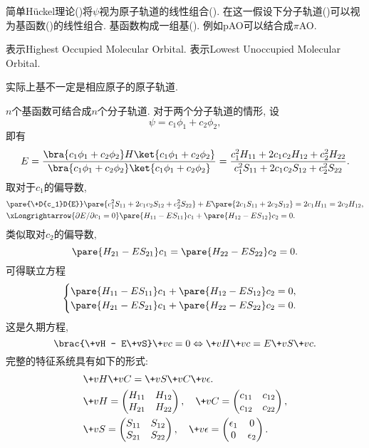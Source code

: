 \documentclass[hidelinks]{ctexart}
\begin{document}
简单H\"uckel理论()将$\psi$视为原子轨道的线性组合(). 在这一假设下分子轨道()可以视为基函数()的线性组合. 基函数构成一组基(). 例如$\mathrm{p}$AO可以结合成$\pi$AO.
\par
{}表示Highest Occupied Molecular Orbital. 表示Lowest Unoccupied Molecular Orbital.
\begin{remark}
    实际上基不一定是相应原子的原子轨道.
\end{remark}
$n$个基函数可结合成$n$个分子轨道. 对于两个分子轨道的情形, 设
\[ \psi = c_1 \phi_1 + c_2 \phi_2, \]
即有
\[ E = \frac{\bra{c_1\phi_1 + c_2 \phi_2}H\ket{c_1 \phi_1 + c_2 \phi_2}}{\bra{c_1\phi_1 + c_2 \phi_2}\ket{c_1 \phi_1 + c_2 \phi_2}} = \frac{c_1^2 H_{11} + 2c_1c_2 H_{12} + c_2^2 H_{22}}{c_1^2 S_{11} + 2c_1c_2 S_{12} + c_2^2 S_{22}}. \]
取对于$c_1$的偏导数,
\begin{align*}
    &\pare{\+D{c_1}D{E}}\pare{c_1^2 S_{11} + 2c_1c_2 S_{12} + c_2^2 S_{22}} + E\pare{2c_1 S_{11} + 2c_2 S_{12}} = 2c_1H_{11} = 2c_2 H_{12}, \\
    & \xLongrightarrow{\partial E/\partial c_1 = 0} \pare{H_{11} - ES_{11}}c_1 + \pare{H_{12} - E S_{12}}c_2 = 0.
\end{align*}
类似取对$c_2$的偏导数,
\[ \pare{H_{21} - ES_{21}}c_1 = \pare{H_{22} - ES_{22}}c_2 = 0. \]
可得联立方程
\[ \begin{cases}
    \pare{H_{11} - ES_{11}}c_1 + \pare{H_{12} - ES_{12}}c_2 = 0, \\
    \pare{H_{21} - ES_{21}}c_1 + \pare{H_{22} - ES_{22}}c_2 = 0.
\end{cases} \]
这是久期方程,
\[ \brac{\+vH - E\+vS}\+vc = 0 \Leftrightarrow \+vH\+vc = E\+vS\+vc. \]
完整的特征系统具有如下的形式:
\begin{align*}
    & \+vH \+vC = \+vS\+vC\+v\epsilon.\\
    & \+vH = \begin{pmatrix}
        H_{11} & H_{12} \\
        H_{21} & H_{22}
    \end{pmatrix},\quad
    \+vC = \begin{pmatrix}
        c_{11} & c_{12} \\
        c_{12} & c_{22}
    \end{pmatrix},\\
    & \+vS = \begin{pmatrix}
        S_{11} & S_{12} \\
        S_{21} & S_{22}
    \end{pmatrix},\quad
    \+v\epsilon = \begin{pmatrix}
        \epsilon_1 & 0 \\
        0 & \epsilon_2
    \end{pmatrix}.
\end{align*}
\end{document}
